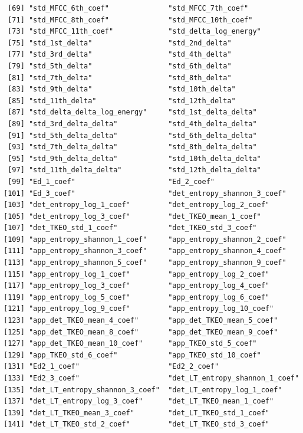 \documentclass[
]{article}
\begin{document}
\begin{verbatim}
 [69] "std_MFCC_6th_coef"              "std_MFCC_7th_coef"             
 [71] "std_MFCC_8th_coef"              "std_MFCC_10th_coef"            
 [73] "std_MFCC_11th_coef"             "std_delta_log_energy"          
 [75] "std_1st_delta"                  "std_2nd_delta"                 
 [77] "std_3rd_delta"                  "std_4th_delta"                 
 [79] "std_5th_delta"                  "std_6th_delta"                 
 [81] "std_7th_delta"                  "std_8th_delta"                 
 [83] "std_9th_delta"                  "std_10th_delta"                
 [85] "std_11th_delta"                 "std_12th_delta"                
 [87] "std_delta_delta_log_energy"     "std_1st_delta_delta"           
 [89] "std_3rd_delta_delta"            "std_4th_delta_delta"           
 [91] "std_5th_delta_delta"            "std_6th_delta_delta"           
 [93] "std_7th_delta_delta"            "std_8th_delta_delta"           
 [95] "std_9th_delta_delta"            "std_10th_delta_delta"          
 [97] "std_11th_delta_delta"           "std_12th_delta_delta"          
 [99] "Ed_1_coef"                      "Ed_2_coef"                     
[101] "Ed_3_coef"                      "det_entropy_shannon_3_coef"    
[103] "det_entropy_log_1_coef"         "det_entropy_log_2_coef"        
[105] "det_entropy_log_3_coef"         "det_TKEO_mean_1_coef"          
[107] "det_TKEO_std_1_coef"            "det_TKEO_std_3_coef"           
[109] "app_entropy_shannon_1_coef"     "app_entropy_shannon_2_coef"    
[111] "app_entropy_shannon_3_coef"     "app_entropy_shannon_4_coef"    
[113] "app_entropy_shannon_5_coef"     "app_entropy_shannon_9_coef"    
[115] "app_entropy_log_1_coef"         "app_entropy_log_2_coef"        
[117] "app_entropy_log_3_coef"         "app_entropy_log_4_coef"        
[119] "app_entropy_log_5_coef"         "app_entropy_log_6_coef"        
[121] "app_entropy_log_9_coef"         "app_entropy_log_10_coef"       
[123] "app_det_TKEO_mean_4_coef"       "app_det_TKEO_mean_5_coef"      
[125] "app_det_TKEO_mean_8_coef"       "app_det_TKEO_mean_9_coef"      
[127] "app_det_TKEO_mean_10_coef"      "app_TKEO_std_5_coef"           
[129] "app_TKEO_std_6_coef"            "app_TKEO_std_10_coef"          
[131] "Ed2_1_coef"                     "Ed2_2_coef"                    
[133] "Ed2_3_coef"                     "det_LT_entropy_shannon_1_coef" 
[135] "det_LT_entropy_shannon_3_coef"  "det_LT_entropy_log_1_coef"     
[137] "det_LT_entropy_log_3_coef"      "det_LT_TKEO_mean_1_coef"       
[139] "det_LT_TKEO_mean_3_coef"        "det_LT_TKEO_std_1_coef"        
[141] "det_LT_TKEO_std_2_coef"         "det_LT_TKEO_std_3_coef"        

\end{verbatim}
\end{document}
